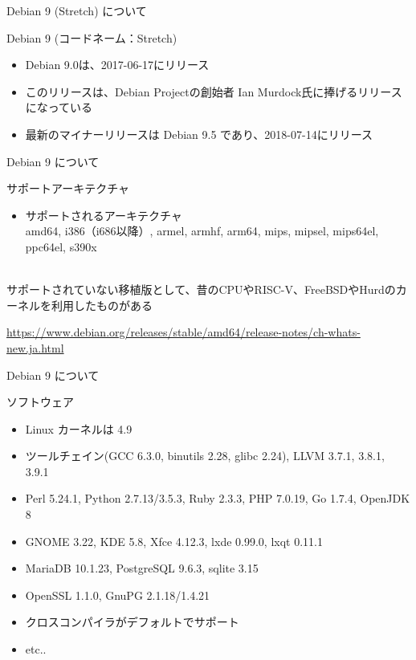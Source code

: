 \begin{frame}{Debian 9 (Stretch) について}%

Debian 9 (コードネーム：Stretch)
\begin{itemize}
  \item Debian 9.0は、2017-06-17にリリース
  \item このリリースは、Debian Projectの創始者 Ian Murdock氏に捧げるリリースになっている

  \item 最新のマイナーリリースは Debian 9.5 であり、2018-07-14にリリース

\end{itemize}
  \begin{center}
  \end{center}
\end{frame}


\begin{frame}{Debian 9 について}%

サポートアーキテクチャ
\begin{itemize}
\item サポートされるアーキテクチャ \\
  amd64, i386（i686以降）, armel, armhf, arm64, mips, mipsel, mips64el, ppc64el, s390x
\end{itemize}

　\\
サポートされていない移植版として、昔のCPUやRISC-V、FreeBSDやHurdのカーネルを利用したものがある

\small{\url{https://www.debian.org/releases/stable/amd64/release-notes/ch-whats-new.ja.html}}

\end{frame}


\begin{frame}{Debian 9 について}%

ソフトウェア
\begin{itemize}
\item Linux カーネルは 4.9
\item ツールチェイン(GCC 6.3.0, binutils 2.28, glibc 2.24), LLVM 3.7.1, 3.8.1, 3.9.1
\item Perl 5.24.1, Python 2.7.13/3.5.3, Ruby 2.3.3, PHP 7.0.19, Go 1.7.4, OpenJDK 8
\item GNOME 3.22, KDE 5.8, Xfce 4.12.3, lxde 0.99.0, lxqt 0.11.1
\item MariaDB 10.1.23, PostgreSQL 9.6.3, sqlite 3.15
\item OpenSSL 1.1.0, GnuPG 2.1.18/1.4.21
\item クロスコンパイラがデフォルトでサポート
\item etc..
\end{itemize}

\end{frame}


